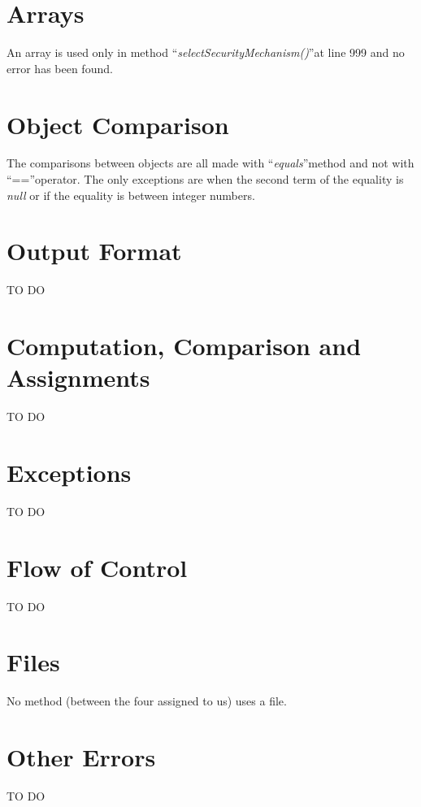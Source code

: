 \documentclass[\mainpath/main]{subfiles}
\begin{document}
\section{Arrays}
\label{CodeInspectionChecklist:Arrays}
An array is used only in method \textquotedblleft \textit{selectSecurityMechanism(\textellipsis)}\textquotedblright at line 999 and no error has been found.

\section{Object Comparison}
\label{CodeInspectionChecklist:ObjectComparison}
The comparisons between objects are all made with \textquotedblleft \textit{equals}\textquotedblright method and not with \textquotedblleft ==\textquotedblright operator. The only exceptions are when the second term of the equality is \textit{null} or if the equality is between integer numbers.

\section{Output Format}
\label{CodeInspectionChecklist:OutputFormat}
TO DO

\section{Computation, Comparison and Assignments}
\label{CodeInspectionChecklist:ComputationComparisonandAssignments}
TO DO

\section{Exceptions}
\label{CodeInspectionChecklist:Exceptions}
TO DO

\section{Flow of Control}
\label{CodeInspectionChecklist:FlowofControl}
TO DO

\section{Files}
\label{CodeInspectionChecklist:Files}
No method (between the four assigned to us) uses a file.

\section{Other Errors}
\label{CodeInspectionChecklist:OtherErrors}
TO DO
\end{document}
